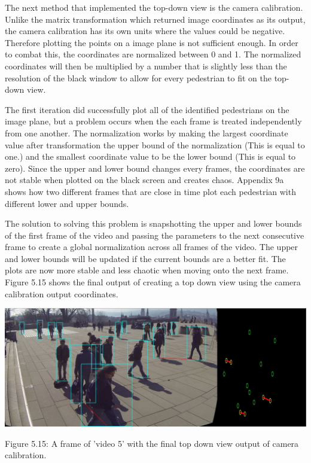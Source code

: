 \documentclass[12pt]{report}
\begin{document}
The next method that implemented the top-down view is the camera calibration. Unlike the matrix transformation which returned image coordinates as its output, the camera calibration has its own units where the values could be negative. Therefore plotting the points on a image plane is not sufficient enough. In order to combat this, the coordinates are normalized between 0 and 1. The normalized coordinates will then be multiplied by a number that is slightly less than the resolution of the black window to allow for every pedestrian to fit on the top-down view.

\vspace{2mm}

The first iteration did successfully plot all of the identified pedestrians on the image plane, but a problem occurs when the each frame is treated independently from one another. The normalization works by making the largest coordinate value after transformation the upper bound of the normalization (This is equal to one.) and the smallest coordinate value to be the lower bound (This is equal to zero). Since the upper and lower bound changes every frames, the coordinates are not stable when plotted on the black screen and creates chaos. Appendix 9a shows how two different frames that are close in time plot each pedestrian with different lower and upper bounds.

\vspace{2mm}

The solution to solving this problem is snapshotting the upper and lower bounds of the first frame of the video and passing the parameters to the next consecutive frame to create a global normalization across all frames of the video. The upper and lower bounds will be updated if the current bounds are a better fit. The plots are now more stable and less chaotic when moving onto the next frame. Figure 5.15 shows the final output of creating a top down view using the camera calibration output coordinates.

\begin{center}
	\includegraphics[width=150mm]{./images/appendix/Stable.JPG}
	
	{\footnotesize Figure 5.15: A frame of 'video 5' with the final top down view output of camera calibration.}
\end{center}
\end{document}

